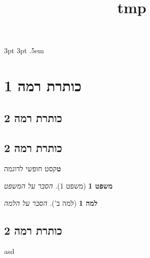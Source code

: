 
\title{tmp}
\setcounter{secnumdepth}{2}		%
\usepackage{amsthm}

{3pt}%
{3pt}%
{\itshape}%
{}%
{\bfseries}%
{}%
{.5em}%
{}

\newtheorem{theorem}{משפט}[subsection]
\theoremstyle{mystyle}
\newtheorem{lemma}[subsection]{למה}

\renewcommand{\thmnote}[1]{\text{#1}}


\section{כותרת רמה 1}
\subsection{כותרת רמה 2}
\subsection{כותרת רמה 2}
\meaning\textbf

טקסט חופשי לדוגמה

\show\itemize

\show\theorem

\show\th@plain
\begin{theorem}[משפט 1]
	הסבר על המשפט
\end{theorem}
\begin{lemma}[למה ב']
	הסבר על הלמה
\end{lemma}
\subsection{כותרת רמה 2}
asd


